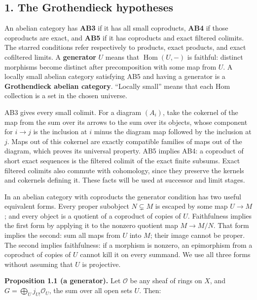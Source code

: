\documentclass[
  english,
  11pt,
  a4paper,
]{article}
\begin{document}
\subsection{1. The Grothendieck
hypotheses}\label{k-injective-resolutions-in-grothendieck-categories--1-the-grothendieck-hypotheses}

An abelian category has \textbf{AB3} if it has all small coproducts,
\textbf{AB4} if those coproducts are exact, and \textbf{AB5} if it has
coproducts and exact filtered colimits. The starred conditions refer
respectively to products, exact products, and exact cofiltered limits. A
\textbf{generator} \(U\) means that \(\operatorname{Hom}(U,-)\) is
faithful: distinct morphisms become distinct after precomposition with
some map from \(U\). A locally small abelian category satisfying AB5 and
having a generator is a \textbf{Grothendieck abelian category}.
``Locally small'' means that each Hom collection is a set in the chosen
universe.

AB3 gives every small colimit. For a diagram \((A_i)\), take the
cokernel of the map from the sum over its arrows to the sum over its
objects, whose component for \(i\to j\) is the inclusion at \(i\) minus
the diagram map followed by the inclusion at \(j\). Maps out of this
cokernel are exactly compatible families of maps out of the diagram,
which proves its universal property. AB5 implies AB4: a coproduct of
short exact sequences is the filtered colimit of the exact finite
subsums. Exact filtered colimits also commute with cohomology, since
they preserve the kernels and cokernels defining it. These facts will be
used at successor and limit stages.

In an abelian category with coproducts the generator condition has two
useful equivalent forms. Every proper subobject \(N\subsetneq M\) is
escaped by some map \(U\to M\); and every object is a quotient of a
coproduct of copies of \(U\). Faithfulness implies the first form by
applying it to the nonzero quotient map \(M\to M/N\). That form implies
the second: sum all maps from \(U\) into \(M\); their image cannot be
proper. The second implies faithfulness: if a morphism is nonzero, an
epimorphism from a coproduct of copies of \(U\) cannot kill it on every
summand. We use all three forms without assuming that \(U\) is
projective.

\textbf{Proposition 1.1 (a generator).} Let \(\mathcal O\) be any sheaf
of rings on \(X\), and \(G=\bigoplus_{U}j_{U!}\mathcal O_U\), the sum
over all open sets \(U\). Then:
\end{document}
